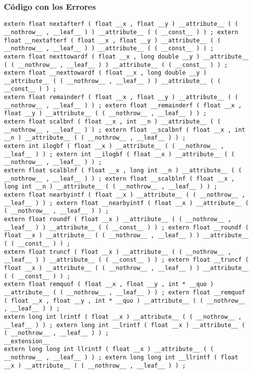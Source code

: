 \documentclass{beamer}
\begin{document}
\begin{frame}[fragile]
\frametitle{C\'odigo con los Errores}
\begin{verbatim}
extern float nextafterf ( float __x , float __y ) __attribute__ ( ( __nothrow__ , __leaf__ ) ) __attribute__ ( ( __const__ ) ) ; extern float __nextafterf ( float __x , float __y ) __attribute__ ( ( __nothrow__ , __leaf__ ) ) __attribute__ ( ( __const__ ) ) ; 
extern float nexttowardf ( float __x , long double __y ) __attribute__ ( ( __nothrow__ , __leaf__ ) ) __attribute__ ( ( __const__ ) ) ; extern float __nexttowardf ( float __x , long double __y ) __attribute__ ( ( __nothrow__ , __leaf__ ) ) __attribute__ ( ( __const__ ) ) ; 
extern float remainderf ( float __x , float __y ) __attribute__ ( ( __nothrow__ , __leaf__ ) ) ; extern float __remainderf ( float __x , float __y ) __attribute__ ( ( __nothrow__ , __leaf__ ) ) ; 
extern float scalbnf ( float __x , int __n ) __attribute__ ( ( __nothrow__ , __leaf__ ) ) ; extern float __scalbnf ( float __x , int __n ) __attribute__ ( ( __nothrow__ , __leaf__ ) ) ; 
extern int ilogbf ( float __x ) __attribute__ ( ( __nothrow__ , __leaf__ ) ) ; extern int __ilogbf ( float __x ) __attribute__ ( ( __nothrow__ , __leaf__ ) ) ; 
extern float scalblnf ( float __x , long int __n ) __attribute__ ( ( __nothrow__ , __leaf__ ) ) ; extern float __scalblnf ( float __x , long int __n ) __attribute__ ( ( __nothrow__ , __leaf__ ) ) ; 
extern float nearbyintf ( float __x ) __attribute__ ( ( __nothrow__ , __leaf__ ) ) ; extern float __nearbyintf ( float __x ) __attribute__ ( ( __nothrow__ , __leaf__ ) ) ; 
extern float roundf ( float __x ) __attribute__ ( ( __nothrow__ , __leaf__ ) ) __attribute__ ( ( __const__ ) ) ; extern float __roundf ( float __x ) __attribute__ ( ( __nothrow__ , __leaf__ ) ) __attribute__ ( ( __const__ ) ) ; 
extern float truncf ( float __x ) __attribute__ ( ( __nothrow__ , __leaf__ ) ) __attribute__ ( ( __const__ ) ) ; extern float __truncf ( float __x ) __attribute__ ( ( __nothrow__ , __leaf__ ) ) __attribute__ ( ( __const__ ) ) ; 
extern float remquof ( float __x , float __y , int * __quo ) __attribute__ ( ( __nothrow__ , __leaf__ ) ) ; extern float __remquof ( float __x , float __y , int * __quo ) __attribute__ ( ( __nothrow__ , __leaf__ ) ) ; 
extern long int lrintf ( float __x ) __attribute__ ( ( __nothrow__ , __leaf__ ) ) ; extern long int __lrintf ( float __x ) __attribute__ ( ( __nothrow__ , __leaf__ ) ) ; 
__extension__ 
extern long long int llrintf ( float __x ) __attribute__ ( ( __nothrow__ , __leaf__ ) ) ; extern long long int __llrintf ( float __x ) __attribute__ ( ( __nothrow__ , __leaf__ ) ) ; 
\end{verbatim}
\end{frame}
\end{document}
